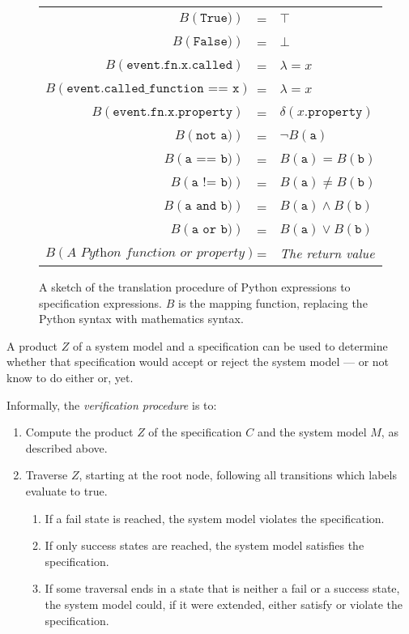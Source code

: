 \begin{figure}[h!]
	\begin{minipage}{0.9\textwidth}
		\centering
    \begin{tabular}{r c l}
      $B(\texttt{True)})$ & = & $\top$ \\
      $B(\texttt{False)})$ & = & $\bot$ \\
      $B(\texttt{event.fn.x.called})$ & = & $\lambda = x$ \\
      $B(\texttt{event.called\_function == x})$ & = & $\lambda = x$ \\
      $B(\texttt{event.fn.x.property})$ & = & $\delta(x.\texttt{property})$ \\
      $B(\texttt{not a)})$ & = & $\neg B(\texttt{a})$ \\
      $B(\texttt{a == b)})$ & = & $B(\texttt{a}) = B(\texttt{b})$ \\
      $B(\texttt{a != b)})$ & = & $B(\texttt{a}) \neq B(\texttt{b})$ \\
      $B(\texttt{a and b)})$ & = & $B(\texttt{a}) \wedge B(\texttt{b})$ \\
      $B(\texttt{a or b)})$ & = & $B(\texttt{a}) \vee B(\texttt{b})$ \\
      $B(\textit{A Python function or property})$ & = & \textit{The return value} \\
    \end{tabular}
  \end{minipage}
  \caption{A sketch of the translation procedure of Python expressions to
    specification expressions. $B$ is the mapping function, replacing the
    Python syntax with mathematics syntax.}
  \label{figure-semantics-translation}
\end{figure}



A product $Z$ of a system model and a specification can be used to determine
whether that specification would accept or reject the system model --- or not
know to do either or, yet.

Informally, the \textit{verification procedure} is to:

\begin{enumerate}
  \item Compute the product $Z$ of the specification $C$ and the system model
    $M$, as described above.

  \item Traverse $Z$, starting at the root node, following all transitions
    which labels evaluate to true.

    \begin{enumerate}
      \item If a fail state is reached, the system model violates the
        specification.
      \item If only success states are reached, the system model satisfies the
        specification.
      \item If some traversal ends in a state that is neither a fail or a
        success state, the system model could, if it were extended, either
        satisfy or violate the specification.
    \end{enumerate}
\end{enumerate}

